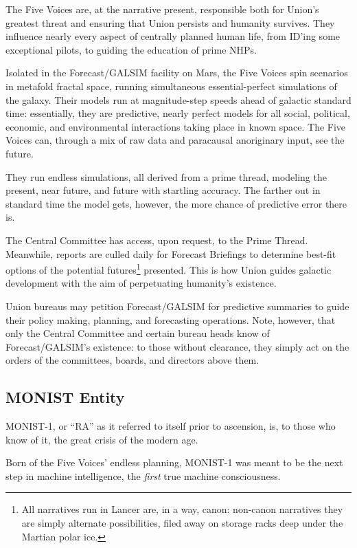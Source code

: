 The Five Voices are, at the narrative present, responsible both for Union’s greatest threat and
ensuring that Union persists and humanity survives. They influence nearly every aspect of
centrally planned human life, from ID’ing some exceptional pilots, to guiding the education of
prime NHPs.

Isolated in the Forecast/GALSIM facility on Mars, the Five Voices spin scenarios in metafold
fractal space, running simultaneous essential-perfect simulations of the galaxy. Their models run
at magnitude-step speeds ahead of galactic standard time: essentially, they are predictive, nearly
perfect models for all social, political, economic, and environmental interactions taking place in
known space. The Five Voices can, through a mix of raw data and paracausal anoriginary input,
see the future.

They run endless simulations, all derived from a prime thread, modeling the present, near future,
and future with startling accuracy. The farther out in standard time the model gets, however, the
more chance of predictive error there is.

The Central Committee has access, upon request, to the Prime Thread. Meanwhile, reports are
culled daily for Forecast Briefings to determine best-fit options of the potential futures\footnote{All narratives run in Lancer are, in a way, canon: non-canon narratives they are simply alternate possibilities, filed away on storage racks deep under the Martian polar ice.}
presented. This is how Union guides galactic development with the aim of perpetuating
humanity’s existence.

Union bureaus may petition Forecast/GALSIM for predictive summaries to guide their policy
making, planning, and forecasting operations. Note, however, that only the Central Committee
and certain bureau heads know of Forecast/GALSIM’s existence: to those without clearance,
they simply act on the orders of the committees, boards, and directors above them.

\subsection{MONIST Entity}

MONIST-1, or ``RA'' as it referred to itself prior to ascension, is, to those who know of it, the great
crisis of the modern age.

Born of the Five Voices’ endless planning, MONIST-1 was meant to be the next step in machine
intelligence, the \textit{first} true machine consciousness.

